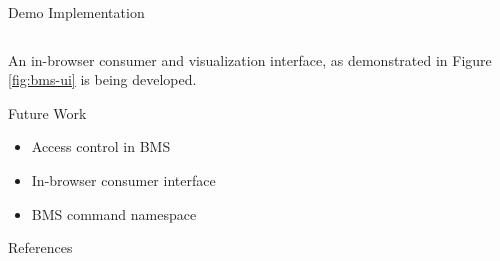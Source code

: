 \documentclass[final,hyperref={pdfpagelabels=false},20pt]{beamer}
\begin{document}
\begin{frame}[t]
\begin{columns}[t]
\begin{column}{.465\textwidth}
\begin{block}{Demo Implementation}
\begin{columns}[T]
\end{columns}

\vspace{10mm}

An in-browser consumer and visualization interface, as demonstrated in Figure \ref{fig:bms-ui} is being developed.

\vspace{10mm}

\end{block}


\begin{block}{Future Work}
\begin{itemize}
\item Access control in BMS
\item In-browser consumer interface
\item BMS command namespace
\end{itemize}
\end{block}


\begin{block}{References}
        
\nocite{*}
\small{
}

\end{block}






\end{column}
\end{columns}
\end{frame}
\end{document}
